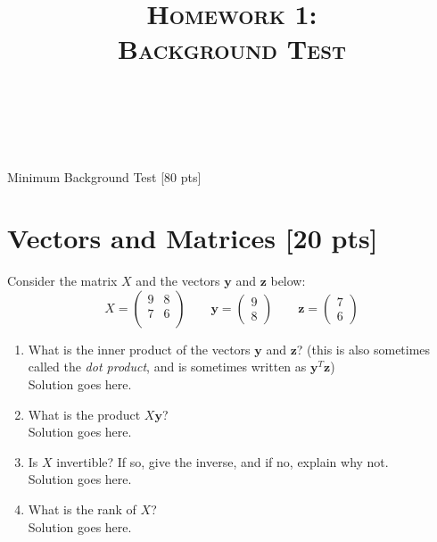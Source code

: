 \documentclass[a4paper]{article}
\title{\textsc{Homework 1: \\ Background Test}} %
\author{
\red{$>>$NAME HERE$<<$} \\
\red{$>>$ID HERE$<<$}\\
}
\date{}
\theoremstyle{definition}
\newenvironment{soln}{
    \leavevmode\color{blue}\ignorespaces
}{}
\begin{document}
\maketitle 


\begin{center}
\Huge
Minimum Background Test [80 pts]
\end{center}

\section{Vectors and Matrices [20 pts]}
Consider the matrix $X$ and the vectors $\mathbf{y}$ and $\textbf{z}$ below:
$$
X = \begin{pmatrix}
9 & 8 \\ 7 & 6 \\
\end{pmatrix}
\qquad \mathbf{y} = \begin{pmatrix}
9 \\ 8
\end{pmatrix} \qquad \mathbf{z} = \begin{pmatrix}
7 \\ 6
\end{pmatrix}
$$
\begin{enumerate}
	\item 	What is the inner product of the vectors $\mathbf{y}$ and $\mathbf{z}$? (this is also sometimes called the \emph{dot product}, and is sometimes written as $\mathbf{y}^T\mathbf{z}$)\\
	    \begin{soln} Solution goes here. \end{soln}
	\item 	What is the product $X\mathbf{y}$?\\
	    \begin{soln}  Solution goes here. \end{soln}
	\item 	Is $X$ invertible? If so, give the inverse, and if no, explain why not.\\
        \begin{soln}  Solution goes here. \end{soln}
	\item 	What is the rank of $X$?\\
	    \begin{soln}  Solution goes here. \end{soln}
\end{enumerate}
\end{document}
